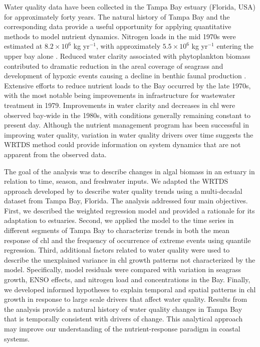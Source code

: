 \documentclass[letterpaper,12pt,oneside]{article}\usepackage{graphicx, color}
\begin{document}
Water quality data have been collected in the Tampa Bay estuary (Florida, USA) for approximately forty years.  The natural history of Tampa Bay and the corresponding data provide a useful opportunity for applying quantitative methods to model nutrient dynamics. Nitrogen loads in the mid 1970s were estimated at $8.2 \times 10^6$ kg yr$^{-1}$, with approximately $5.5 \times 10^6$ kg yr$^{-1}$ entering the upper bay alone \citep{Poe05,Greening06}.  Reduced water clarity associated with phytoplankton biomass contributed to dramatic reduction in the areal coverage of seagrass \citep{Tomasko05} and development of hypoxic events causing a decline in benthic faunal production \citep{Santos80}.  Extensive efforts to reduce nutrient loads to the Bay occurred by the late 1970s, with the most notable being improvements in infrastructure for wastewater treatment in 1979.  Improvements in water clarity and decreases in \ac{chl} were observed bay-wide in the 1980s, with conditions generally remaining constant to present day. Although the nutrient management program has been successful in improving water quality, variation in water quality drivers over time suggests the \ac{WRTDS} method could provide information on system dynamics that are not apparent from the observed data.

The goal of the analysis was to describe changes in algal biomass in an estuary in relation to time, season, and freshwater inputs.  We adapted the \ac{WRTDS} approach developed by \citet{Hirsch10} to describe water quality trends using a multi-decadal dataset from Tampa Bay, Florida. The analysis addressed four main objectives.  First, we described the weighted regression model and provided a rationale for its adaptation to estuaries.  Second, we applied the model to the time series in different segments of Tampa Bay to characterize trends in both the mean response of \ac{chl} and the frequency of occurrence of extreme events using quantile regression.  Third, additional factors related to water quality were used to describe the unexplained variance in \ac{chl} growth patterns not characterized by the model.  Specifically, model residuals were compared with variation in seagrass growth, \ac{ENSO} effects, and nitrogen load and concentrations in the Bay.  Finally, we developed informed hypotheses to explain temporal and spatial patterns in \ac{chl} growth in response to large scale drivers that affect water quality.  Results from the analysis provide a natural history of water quality changes in Tampa Bay that is temporally consistent with drivers of change.  This analytical approach may improve our understanding of the nutrient-response paradigm in coastal systems.  
\end{document}
